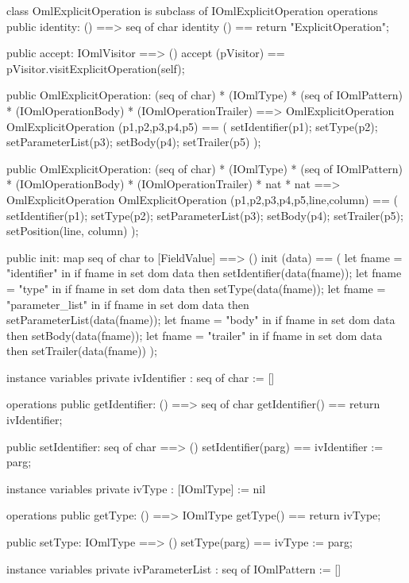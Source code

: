 \begin{vdm_al}
class OmlExplicitOperation is subclass of IOmlExplicitOperation
operations
  public identity: () ==> seq of char
  identity () == return "ExplicitOperation";

  public accept: IOmlVisitor ==> ()
  accept (pVisitor) == pVisitor.visitExplicitOperation(self);

  public OmlExplicitOperation:
    (seq of char) *
    (IOmlType) *
    (seq of IOmlPattern) *
    (IOmlOperationBody) *
    (IOmlOperationTrailer) ==> OmlExplicitOperation
  OmlExplicitOperation (p1,p2,p3,p4,p5) == 
    ( setIdentifier(p1);
      setType(p2);
      setParameterList(p3);
      setBody(p4);
      setTrailer(p5) );

  public OmlExplicitOperation:
    (seq of char) *
    (IOmlType) *
    (seq of IOmlPattern) *
    (IOmlOperationBody) *
    (IOmlOperationTrailer) *
    nat *
    nat ==> OmlExplicitOperation
  OmlExplicitOperation (p1,p2,p3,p4,p5,line,column) == 
    ( setIdentifier(p1);
      setType(p2);
      setParameterList(p3);
      setBody(p4);
      setTrailer(p5);
      setPosition(line, column) );

  public init: map seq of char to [FieldValue] ==> ()
  init (data) ==
    ( let fname = "identifier" in
        if fname in set dom data
        then setIdentifier(data(fname));
      let fname = "type" in
        if fname in set dom data
        then setType(data(fname));
      let fname = "parameter_list" in
        if fname in set dom data
        then setParameterList(data(fname));
      let fname = "body" in
        if fname in set dom data
        then setBody(data(fname));
      let fname = "trailer" in
        if fname in set dom data
        then setTrailer(data(fname)) );

instance variables
  private ivIdentifier : seq of char := []

operations
  public getIdentifier: () ==> seq of char
  getIdentifier() == return ivIdentifier;

  public setIdentifier: seq of char ==> ()
  setIdentifier(parg) == ivIdentifier := parg;

instance variables
  private ivType : [IOmlType] := nil

operations
  public getType: () ==> IOmlType
  getType() == return ivType;

  public setType: IOmlType ==> ()
  setType(parg) == ivType := parg;

instance variables
  private ivParameterList : seq of IOmlPattern := []


\end{vdm_al}
